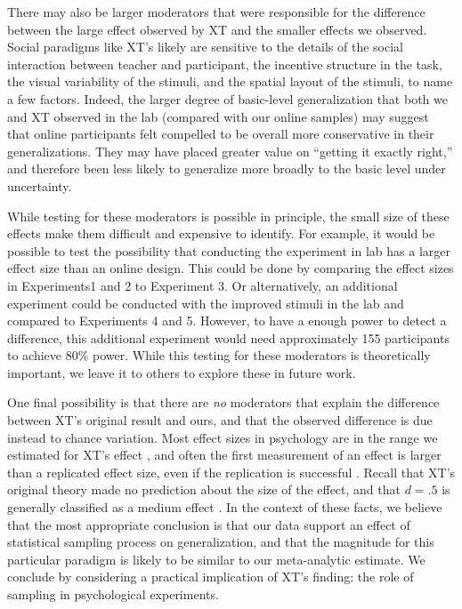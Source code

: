 \documentclass[man]{apa2}
\begin{document}
There may also be larger moderators that were responsible for the difference between the large effect observed by XT and the smaller effects we observed. Social paradigms like XT's likely are sensitive to the details of the social interaction between teacher and participant, the incentive structure in the task, the visual variability of the stimuli, and the spatial layout of the stimuli, to name a few factors. Indeed, the larger degree of basic-level generalization that both we and XT observed in the lab (compared with our online samples) may suggest that online participants felt compelled to be overall more conservative in their generalizations. They may have placed greater value on ``getting it exactly right,'' and therefore been less likely to generalize more broadly to the basic level under uncertainty. 

While testing for these moderators is possible in principle, the small size of these effects make them difficult and expensive to identify. For example, it would be possible to  test the possibility that conducting the experiment in lab has a larger effect size than an online design. This could be done by comparing the effect sizes in Experiments1 and 2 to Experiment 3. Or alternatively, an additional experiment could be conducted with the improved stimuli in the lab and compared to Experiments 4 and 5. However, to have a enough power to detect a difference, this additional experiment would need approximately 155 participants to achieve 80\% power. While this testing for these moderators is theoretically important, we leave it to others to explore these in future work.


One final possibility is that there are \emph{no} moderators that explain the difference between XT's original result and ours, and that the observed difference is due instead to chance variation. Most effect sizes in psychology are in the range we estimated for XT's effect \cite{richard2003}, and often the first measurement of an effect is larger than a replicated effect size, even if the replication is successful \cite{reproProj2015}. Recall that XT's original theory made no prediction about the size of the effect, and that $d=.5$ is generally classified as a medium effect \cite{cohen1992}. In the context of these facts, we believe that the most appropriate conclusion is that our data support an effect of statistical sampling process on generalization, and that the magnitude for this particular paradigm is likely to be similar to our meta-analytic estimate. We conclude by considering a practical implication of XT's finding: the role of sampling in psychological experiments.
\end{document}
